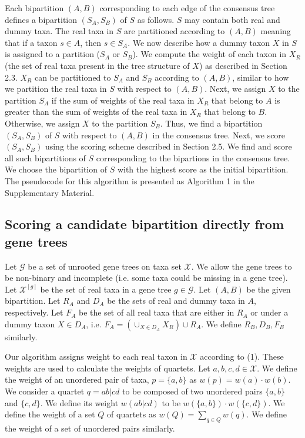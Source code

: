 \documentclass[11pt]{article}
\begin{document}
Each bipartition $(A, B)$ corresponding to each edge of the consensus tree defines a bipartition $(S_A, S_B)$ of $S$ as follows. $S$ may contain both real and dummy taxa. The real taxa in $S$ are partitioned according to $(A, B)$ meaning that if a taxon $s \in A$, then $s \in S_A$. We now describe how a dummy taxon $X$ in $S$ is assigned to a partition ($S_A$ or $S_B$). We compute the weight of each taxon in $X_R$ (the set of real taxa present in the tree structure of $X$) as described in Section 2.3. $X_R$ can be partitioned to $S_A$ and $S_B$ according to $(A, B)$, similar to how we partition the real taxa in $S$ with respect to $(A, B)$. Next, we assign $X$ to the partition $S_A$ if the sum of weights of the real taxa in $X_R$ that belong to $A$ is greater than the sum of weights of the real taxa in $X_R$ that belong to $B$. Otherwise, we assign $X$ to the partition $S_B$. Thus, we find a bipartition $(S_A, S_B)$ of $S$ with respect to $(A, B)$ in the consensus tree. Next, we score $(S_A, S_B)$ using the scoring scheme described in Section 2.5. We find and score all such bipartitions of $S$ corresponding to the bipartions in the consensus tree. We choose the bipartition of $S$ with the highest score as the initial bipartition. The pseudocode for this algorithm is presented as Algorithm 1 in the Supplementary Material.

\subsection*{Scoring a candidate bipartition directly from gene trees}

Let $\mathcal{G}$ be a set of unrooted gene trees on taxa set $\mathcal{X}$. We allow the gene trees to be non-binary and incomplete (i.e. some taxa could be missing in a gene tree). Let $\mathcal{X}^{[g]}$ be the set of real taxa in a gene tree $g \in \mathcal{G}$. Let $(A, B)$ be the given bipartition. Let $R_A$ and $D_A$ be the sets of real and dummy taxa in $A$, respectively. Let $F_A$ be the set of all real taxa that are either in $R_A$ or under a dummy taxon $X \in D_A$, i.e. $F_A = (\cup_{X \in D_A} X_R) \cup R_A$. We define $R_B, D_B, F_B$ similarly.

Our algorithm assigns weight to each real taxon in $\mathcal{X}$ according to (1). These weights are used to calculate the weights of quartets. Let $a, b, c, d \in \mathcal{X}$. We define the weight of an unordered pair of taxa, $p = \{a, b\}$ as $w(p) = w(a) \cdot w(b)$. We consider a quartet $q = ab|cd$ to be composed of two unordered pairs $\{a, b\}$ and $\{c, d\}$. We define its weight $w(ab|cd)$ to be $w(\{a, b\}) \cdot w(\{c, d\})$. We define the weight of a set $Q$ of quartets as $w(Q) = \sum_{q \in Q} w(q)$. We define the weight of a set of unordered pairs similarly.
\end{document}
